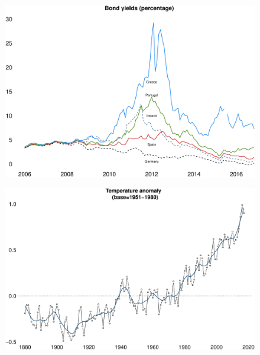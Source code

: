 \documentclass{beamer}
\begin{document}
\begin{frame}
  \begin{figure}
    \includegraphics[scale=.3]{bond_yields.eps}
  \end{figure}
\end{frame}

\begin{frame}
  \begin{figure}
    \includegraphics[scale=.25]{temperature.eps}
  \end{figure}
\end{frame}
\end{document}
